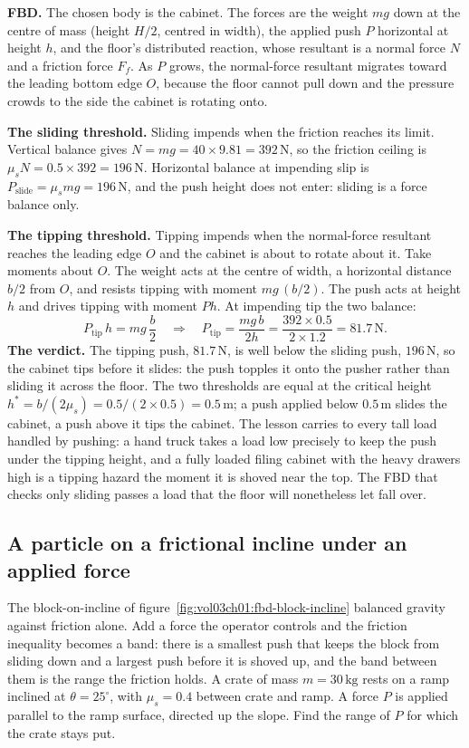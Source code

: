 \textbf{FBD.} The chosen body is the cabinet. The forces are the weight
$mg$ down at the centre of mass (height $H/2$, centred in width), the
applied push $P$ horizontal at height $h$, and the floor's distributed
reaction, whose resultant is a normal force $N$ and a friction force $F_f$.
As $P$ grows, the normal-force resultant migrates toward the leading bottom
edge $O$, because the floor cannot pull down and the pressure crowds to the
side the cabinet is rotating onto.

\textbf{The sliding threshold.} Sliding impends when the friction reaches
its limit. Vertical balance gives $N = mg = 40 \times 9.81 = 392\,\text{N}$,
so the friction ceiling is $\mu_s N = 0.5 \times 392 = 196\,\text{N}$.
Horizontal balance at impending slip is $P_{\text{slide}} = \mu_s mg =
196\,\text{N}$, and the push height does not enter: sliding is a force
balance only.

\textbf{The tipping threshold.} Tipping impends when the normal-force
resultant reaches the leading edge $O$ and the cabinet is about to rotate
about it. Take moments about $O$. The weight acts at the centre of width, a
horizontal distance $b/2$ from $O$, and resists tipping with moment $mg\,
(b/2)$. The push acts at height $h$ and drives tipping with moment $P h$. At
impending tip the two balance:
\[
P_{\text{tip}}\,h = mg\,\frac{b}{2}
\quad\Longrightarrow\quad
P_{\text{tip}} = \frac{mg\,b}{2h}
= \frac{392 \times 0.5}{2 \times 1.2} = 81.7\,\text{N}.
\]
\textbf{The verdict.} The tipping push, $81.7\,\text{N}$, is well below the
sliding push, $196\,\text{N}$, so the cabinet tips before it slides: the
push topples it onto the pusher rather than sliding it across the floor. The
two thresholds are equal at the critical height $h^\ast = b/(2\mu_s) = 0.5/
(2 \times 0.5) = 0.5\,\si{\meter}$; a push applied below $0.5\,\si{\meter}$
slides the cabinet, a push above it tips the cabinet. The lesson carries to
every tall load handled by pushing: a hand truck takes a load low precisely
to keep the push under the tipping height, and a fully loaded filing cabinet
with the heavy drawers high is a tipping hazard the moment it is shoved near
the top. The FBD that checks only sliding passes a load that the floor will
nonetheless let fall over.

\subsection{A particle on a frictional incline under an applied force}

The block-on-incline of figure~\ref{fig:vol03ch01:fbd-block-incline}
balanced gravity against friction alone. Add a force the operator controls
and the friction inequality becomes a band: there is a smallest push that
keeps the block from sliding down and a largest push before it is shoved up,
and the band between them is the range the friction holds. A crate of mass
$m = 30\,\si{\kilogram}$ rests on a ramp inclined at $\theta = 25^{\circ}$,
with $\mu_s = 0.4$ between crate and ramp. A force $P$ is applied parallel to
the ramp surface, directed up the slope. Find the range of $P$ for which the
crate stays put.

